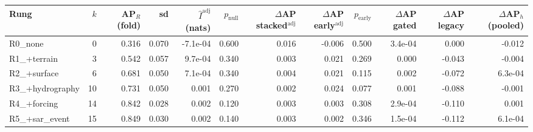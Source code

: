 \begin{tabular}{lrrrrrrrrrrr}
\toprule
Rung & $k$ & AP$_R$ (fold) & sd & $\hat I^{\mathrm{adj}}$ (nats) & $p_{\mathrm{null}}$ & $\Delta$AP stacked$^{\mathrm{adj}}$ & $\Delta$AP early$^{\mathrm{adj}}$ & $p_{\mathrm{early}}$ & $\Delta$AP gated & $\Delta$AP legacy & $\Delta$AP$_h$ (pooled) \\
\midrule
R0\_none & 0 & 0.316 & 0.070 & -7.1e-04 & 0.600 & 0.016 & -0.006 & 0.500 & 3.4e-04 & 0.000 & -0.012 \\
R1\_+terrain & 3 & 0.542 & 0.057 & 9.7e-04 & 0.340 & 0.003 & 0.021 & 0.269 & 0.000 & -0.043 & -0.004 \\
R2\_+surface & 6 & 0.681 & 0.050 & 7.1e-04 & 0.340 & 0.004 & 0.021 & 0.115 & 0.002 & -0.072 & 6.3e-04 \\
R3\_+hydrography & 10 & 0.731 & 0.050 & 0.001 & 0.270 & 0.002 & 0.024 & 0.077 & 0.001 & -0.088 & -0.001 \\
R4\_+forcing & 14 & 0.842 & 0.028 & 0.002 & 0.120 & 0.003 & 0.003 & 0.308 & 2.9e-04 & -0.110 & 0.001 \\
R5\_+sar\_event & 15 & 0.849 & 0.030 & 0.002 & 0.140 & 0.003 & 0.002 & 0.346 & 1.5e-04 & -0.112 & 6.1e-04 \\
\bottomrule
\end{tabular}
